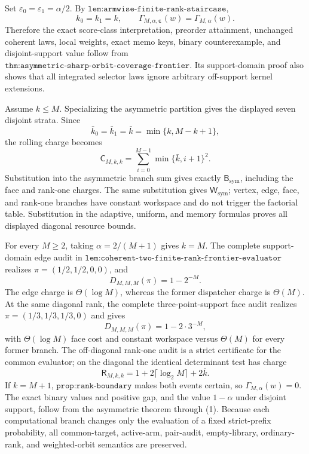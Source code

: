 Set \(\varepsilon_0=\varepsilon_1=\alpha/2\). By \(\texttt{lem:armwise-finite-rank-staircase}\),
\[
k_0=k_1=k,
\qquad
\Gamma_{M,\alpha,\boldsymbol\varepsilon}(w)=\Gamma_{M,\alpha}(w).
\tag{1}
\]
Therefore the exact score-class interpretation, preorder attainment, unchanged coherent laws, local weights, exact memo keys, binary counterexample, and disjoint-support value follow from \(\texttt{thm:asymmetric-sharp-orbit-coverage-frontier}\). Its support-domain proof also shows that all integrated selector laws ignore arbitrary off-support kernel extensions.

Assume \(k\le M\). Specializing the asymmetric partition gives the displayed seven disjoint strata. Since
\[
\bar k_0=\bar k_1=\bar k=\min\{k,M-k+1\},
\]
the rolling charge becomes
\[
\mathsf C_{M,k,k}=\sum_{i=0}^{M-1}\min\{\bar k,i+1\}^2.
\]
Substitution into the asymmetric branch sum gives exactly \(\mathsf B_{\mathrm{sym}}\), including the face and rank-one charges. The same substitution gives \(\mathsf W_{\mathrm{sym}}\); vertex, edge, face, and rank-one branches have constant workspace and do not trigger the factorial table. Substitution in the adaptive, uniform, and memory formulas proves all displayed diagonal resource bounds.

For every \(M\ge2\), taking \(\alpha=2/(M+1)\) gives \(k=M\). The complete support-domain edge audit in \(\texttt{lem:coherent-two-finite-rank-frontier-evaluator}\) realizes \(\pi=(1/2,1/2,0,0)\), and
\[
D_{M,M,M}(\pi)=1-2^{-M}.
\]
The edge charge is \(\Theta(\log M)\), whereas the former dispatcher charge is \(\Theta(M)\). At the same diagonal rank, the complete three-point-support face audit realizes \(\pi=(1/3,1/3,1/3,0)\) and gives
\[
D_{M,M,M}(\pi)=1-2\cdot3^{-M},
\]
with \(\Theta(\log M)\) face cost and constant workspace versus \(\Theta(M)\) for every former branch. The off-diagonal rank-one audit is a strict certificate for the common evaluator; on the diagonal the identical determinant test has charge
\[
\mathsf R_{M,k,k}=1+2\lceil\log_2M\rceil+2\bar k.
\]
If \(k=M+1\), \(\texttt{prop:rank-boundary}\) makes both events certain, so \(\Gamma_{M,\alpha}(w)=0\). The exact binary values and positive gap, and the value \(1-\alpha\) under disjoint support, follow from the asymmetric theorem through (1). Because each computational branch changes only the evaluation of a fixed strict-prefix probability, all common-target, active-arm, pair-audit, empty-library, ordinary-rank, and weighted-orbit semantics are preserved.